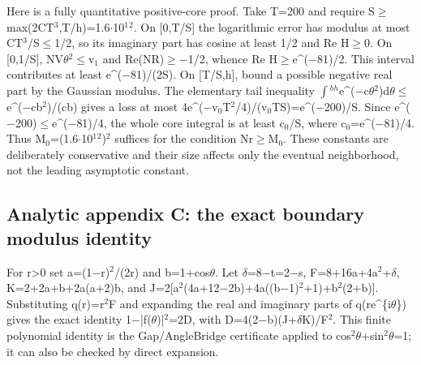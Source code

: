 \documentclass[11pt,a4paper]{article}
\begin{document}
Here is a fully quantitative positive-core proof. Take T=200 and require S\ensuremath{\geq}max(2CT\ensuremath{^3},T/h)=1.6\ensuremath{\cdot}10\ensuremath{^1}\ensuremath{^2}. On [0,T/S] the logarithmic error has modulus at most CT\ensuremath{^3}/S\ensuremath{\leq}1/2, so its imaginary part has cosine at least 1/2 and Re H\ensuremath{\geq}0. On [0,1/S], NV\ensuremath{\theta}\ensuremath{^2}\ensuremath{\leq}v\ensuremath{_1} and Re(NR)\ensuremath{\geq}\ensuremath{-}1/2, whence Re H\ensuremath{\geq}e\textasciicircum{}(\ensuremath{-}81)/2. This interval contributes at least e\textasciicircum{}(\ensuremath{-}81)/(2S). On [T/S,h], bound a possible negative real part by the Gaussian modulus. The elementary tail inequality \ensuremath{\int}\ensuremath{^{b}}\ensuremath{^{h}}e\textasciicircum{}(\ensuremath{-}c\ensuremath{\theta}\ensuremath{^2})d\ensuremath{\theta}\ensuremath{\leq}e\textasciicircum{}(\ensuremath{-}cb\ensuremath{^2})/(cb) gives a loss at most 4e\textasciicircum{}(\ensuremath{-}v\ensuremath{_0}T\ensuremath{^2}/4)/(v\ensuremath{_0}TS)=e\textasciicircum{}(\ensuremath{-}200)/S. Since e\textasciicircum{}(\ensuremath{-}200)\ensuremath{\leq}e\textasciicircum{}(\ensuremath{-}81)/4, the whole core integral is at least c\ensuremath{_0}/S, where c\ensuremath{_0}=e\textasciicircum{}(\ensuremath{-}81)/4. Thus M\ensuremath{_0}=(1.6\ensuremath{\cdot}10\ensuremath{^1}\ensuremath{^2})\ensuremath{^2} suffices for the condition Nr\ensuremath{\geq}M\ensuremath{_0}. These constants are deliberately conservative and their size affects only the eventual neighborhood, not the leading asymptotic constant.

\subsection{Analytic appendix C: the exact boundary modulus identity}
For r>0 set a=(1\ensuremath{-}r)\ensuremath{^2}/(2r) and b=1+cos\ensuremath{\theta}. Let \ensuremath{\delta}=8\ensuremath{-}t=2\ensuremath{-}s, F=8+16a+4a\ensuremath{^2}+\ensuremath{\delta}, K=2+2a+b+2a(a+2)b, and J=2[a\ensuremath{^2}(4a+12\ensuremath{-}2b)+4a((b\ensuremath{-}1)\ensuremath{^2}+1)+b\ensuremath{^2}(2+b)]. Substituting q(r)=r\ensuremath{^2}F and expanding the real and imaginary parts of q(re\textasciicircum{}\{i\ensuremath{\theta}\}) gives the exact identity 1\ensuremath{-}|f(\ensuremath{\theta})|\ensuremath{^2}=2D, with D=4(2\ensuremath{-}b)(J+\ensuremath{\delta}K)/F\ensuremath{^2}. This finite polynomial identity is the Gap/AngleBridge certificate applied to cos\ensuremath{^2}\ensuremath{\theta}+sin\ensuremath{^2}\ensuremath{\theta}=1; it can also be checked by direct expansion.
\end{document}

